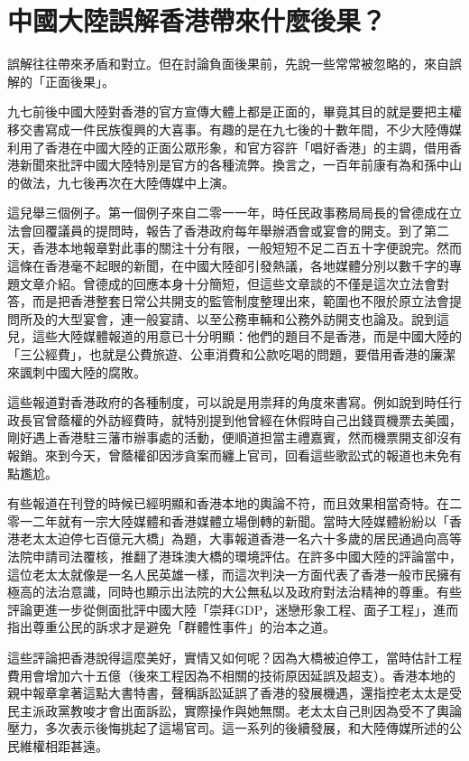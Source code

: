 \section{中國大陸誤解香港帶來什麼後果？}

誤解往往帶來矛盾和對立。但在討論負面後果前，先說一些常常被忽略的，來自誤解的「正面後果」。

九七前後中國大陸對香港的官方宣傳大體上都是正面的，畢竟其目的就是要把主權移交書寫成一件民族復興的大喜事。有趣的是在九七後的十數年間，不少大陸傳媒利用了香港在中國大陸的正面公眾形象，和官方容許「唱好香港」的主調，借用香港新聞來批評中國大陸特別是官方的各種流弊。換言之，一百年前康有為和孫中山的做法，九七後再次在大陸傳媒中上演。

這兒舉三個例子。第一個例子來自二零一一年，時任民政事務局局長的曾德成在立法會回覆議員的提問時，報告了香港政府每年舉辦酒會或宴會的開支。到了第二天，香港本地報章對此事的關注十分有限，一般短短不足二百五十字便說完。然而這條在香港毫不起眼的新聞，在中國大陸卻引發熱議，各地媒體分別以數千字的專題文章介紹。曾德成的回應本身十分簡短，但這些文章談的不僅是這次立法會對答，而是把香港整套日常公共開支的監管制度整理出來，範圍也不限於原立法會提問所及的大型宴會，連一般宴請、以至公務車輛和公務外訪開支也論及。說到這兒，這些大陸媒體報道的用意已十分明顯：他們的題目不是香港，而是中國大陸的「三公經費」，也就是公費旅遊、公車消費和公款吃喝的問題，要借用香港的廉潔來諷刺中國大陸的腐敗。

這些報道對香港政府的各種制度，可以說是用祟拜的角度來書寫。例如說到時任行政長官曾蔭權的外訪經費時，就特別提到他曾經在休假時自己出錢買機票去美國，剛好遇上香港駐三藩市辦事處的活動，便順道担當主禮嘉賓，然而機票開支卻沒有報銷。來到今天，曾蔭權卻因涉貪案而纏上官司，回看這些歌訟式的報道也未免有點尷尬。

有些報道在刊登的時候已經明顯和香港本地的輿論不符，而且效果相當奇特。在二零一二年就有一宗大陸媒體和香港媒體立場倒轉的新聞。當時大陸媒體紛紛以「香港老太太迫停七百億元大橋」為題，大事報道香港一名六十多歲的居民通過向高等法院申請司法覆核，推翻了港珠澳大橋的環境評估。在許多中國大陸的評論當中，這位老太太就像是一名人民英雄一樣，而這次判決一方面代表了香港一般市民擁有極高的法治意識，同時也顯示出法院的大公無私以及政府對法治精神的尊重。有些評論更進一步從側面批評中國大陸「崇拜GDP，迷戀形象工程、面子工程」，進而指出尊重公民的訴求才是避免「群體性事件」的治本之道。

這些評論把香港說得這麼美好，實情又如何呢？因為大橋被迫停工，當時估計工程費用會增加六十五億（後來工程因為不相關的技術原因延誤及超支）。香港本地的親中報章拿著這點大書特書，聲稱訴訟延誤了香港的發展機遇，還指控老太太是受民主派政黨教唆才會出面訴訟，實際操作與她無關。老太太自己則因為受不了輿論壓力，多次表示後悔挑起了這場官司。這一系列的後續發展，和大陸傳媒所述的公民維權相距甚遠。


